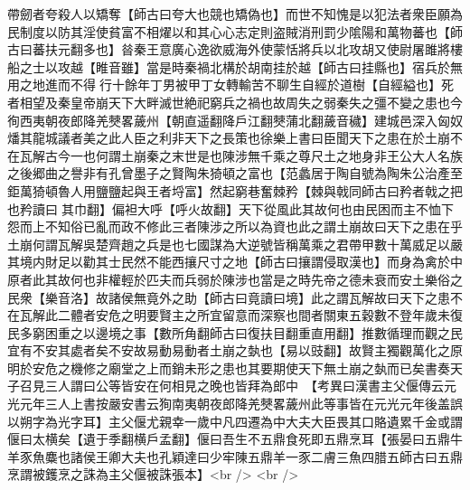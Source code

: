 帶劒者夸殺人以矯奪【師古曰夸大也競也矯偽也】而世不知愧是以犯法者衆臣願為民制度以防其淫使貧富不相燿以和其心心志定則盗賊消刑罰少隂陽和萬物蕃也【師古曰蕃扶元翻多也】㫺秦王意廣心逸欲威海外使蒙恬將兵以北攻胡又使尉屠雎將樓船之士以攻越【睢音雖】當是時秦禍北構於胡南挂於越【師古曰挂縣也】宿兵於無用之地進而不得行十餘年丁男被甲丁女轉輸苦不聊生自經於道樹【自經縊也】死者相望及秦皇帝崩天下大畔滅世絶祀窮兵之禍也故周失之弱秦失之彊不變之患也今徇西夷朝夜郎降羌僰畧薉州【朝直遥翻降戶江翻僰蒲北翻薉音穢】建城邑深入匈奴燔其龍城議者美之此人臣之利非天下之長策也徐樂上書曰臣聞天下之患在於土崩不在瓦解古今一也何謂土崩秦之末世是也陳涉無千乘之尊尺土之地身非王公大人名族之後郷曲之譽非有孔曾墨子之賢陶朱猗頓之富也【范蠡居于陶自號為陶朱公治產至鉅萬猗頓魯人用鹽鹽起與王者埒富】然起窮巷奮棘矜【棘與戟同師古曰矜者戟之把也矜讀曰其巾翻】偏袒大呼【呼火故翻】天下從風此其故何也由民困而主不恤下怨而上不知俗已亂而政不修此三者陳涉之所以為資也此之謂土崩故曰天下之患在乎土崩何謂瓦解吳楚齊趙之兵是也七國謀為大逆號皆稱萬乘之君帶甲數十萬威足以嚴其境内財足以勸其士民然不能西攘尺寸之地【師古曰攘謂侵取漢也】而身為禽於中原者此其故何也非權輕於匹夫而兵弱於陳涉也當是之時先帝之德未衰而安土樂俗之民衆【樂音洛】故諸侯無竟外之助【師古曰竟讀曰境】此之謂瓦解故曰天下之患不在瓦解此二體者安危之明要賢主之所宜留意而深察也間者關東五穀數不登年歲未復民多窮困重之以邊境之事【數所角翻師古曰復扶目翻重直用翻】推數循理而觀之民宜有不安其處者矣不安故易動易動者土崩之埶也【易以豉翻】故賢主獨觀萬化之原明於安危之機修之廟堂之上而銷未形之患也其要期使天下無土崩之埶而已矣書奏天子召見三人謂曰公等皆安在何相見之晚也皆拜為郎中　【考異曰漢書主父偃傳云元光元年三人上書按嚴安書云狥南夷朝夜郎降羌僰畧薉州此等事皆在元光元年後盖誤以朔字為光字耳】主父偃尤親幸一歲中凡四遷為中大夫大臣畏其口賂遺累千金或謂偃曰太横矣【遺于季翻横戶孟翻】偃曰吾生不五鼎食死即五鼎烹耳【張晏曰五鼎牛羊豕魚麋也諸侯王卿大夫也孔穎達曰少牢陳五鼎羊一豕二膚三魚四腊五師古曰五鼎烹謂被鑊烹之誅為主父偃被誅張本】<br />
<br />
